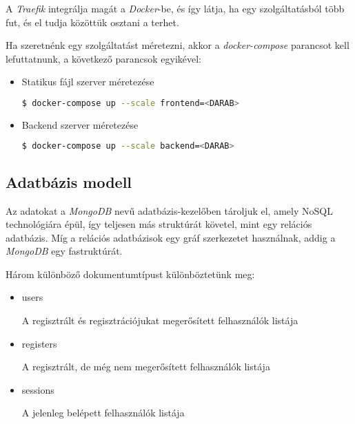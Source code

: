 A \emph{Traefik} integrálja magát a \emph{Docker}-be, és így látja, ha egy szolgáltatásból több fut, és el tudja közöttük osztani a terhet.

Ha szeretnénk egy szolgáltatást méretezni, akkor a \emph{docker-compose} parancsot kell lefuttatnunk, a következő parancsok egyikével:

\begin{itemize}
      \item Statikus fájl szerver méretezése
            \begin{lstlisting}[language=bash]
        $ docker-compose up --scale frontend=<DARAB>\end{lstlisting}
      \item Backend szerver méretezése
            \begin{lstlisting}[language=bash]
        $ docker-compose up --scale backend=<DARAB>\end{lstlisting}
\end{itemize}

\subsection{Adatbázis modell}

Az adatokat a \emph{MongoDB} nevű adatbázis-kezelőben tároljuk el, amely NoSQL technológiára épül, így teljesen más struktúrát követel, mint egy relációs adatbázis. Míg a relációs adatbázisok egy gráf szerkezetet használnak, addig a \emph{MongoDB} egy fastruktúrát.


Három különböző dokumentumtípust különböztetünk meg:
\begin{itemize}
      \item users

            A regisztrált és regisztrációjukat megerősített felhasználók listája
      \item registers

            A regisztrált, de még nem megerősített felhasználók listája
      \item sessions

            A jelenleg belépett felhasználók listája
\end{itemize}

